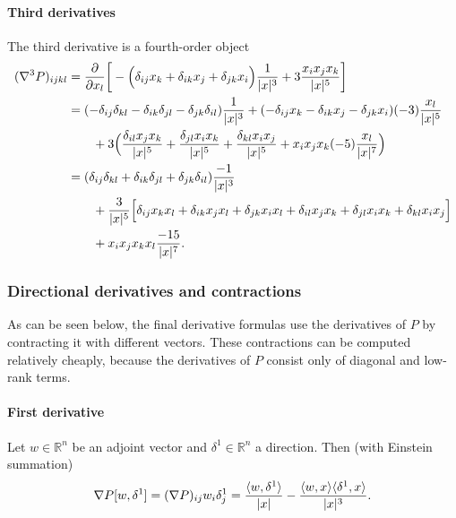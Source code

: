 \documentclass[a4paper]{article}
\newcommand{\R}{\mathbb R}
\DeclarePairedDelimiter{\abs}{\lvert}{\rvert}
\begin{document}
\paragraph{Third derivatives}

The third derivative is a fourth-order object
\begin{align*}
 (\nabla^3 P)_{ijkl}
 & =
 \frac{\partial}{\partial x_l}
 \bigg[ - \Big( \delta_{ij}x_k + \delta_{ik}x_j + \delta_{jk}x_i\Big) \frac{1}{\abs{x}^3}
 + 3 \frac{x_i x_j x_k}{\abs{x}^5} \bigg]
 \\
 & =
 (-\delta_{ij}\delta_{kl} - \delta_{ik}\delta_{jl} - \delta_{jk} \delta_{il}) \frac{1}{\abs{x}^3}
 + (-\delta_{ij}x_k - \delta_{ik}x_j - \delta_{jk}x_i)(-3)\frac{x_l}{\abs{x}^5}
 \\
 & \qquad
 + 3\Big(\frac{\delta_{il} x_j x_k}{\abs{x}^5} + \frac{\delta_{jl} x_i x_k}{\abs{x}^5}
   + \frac{\delta_{kl} x_i x_j}{\abs{x}^5} + x_i x_j x_k (-5) \frac{x_l}{\abs{x}^7} \Big)
 \\
 & =
 (\delta_{ij}\delta_{kl} + \delta_{ik}\delta_{jl} + \delta_{jk} \delta_{il}) \frac{-1}{\abs{x}^3}
 \\
 & \qquad
 + \frac{3}{\abs{x}^5} \Big[ \delta_{ij}x_k x_l + \delta_{ik}x_jx_l + \delta_{jk}x_ix_l
   + \delta_{il} x_j x_k + \delta_{jl} x_i x_k + \delta_{kl}x_i x_j \Big]
 \\
 & \qquad
 + x_i x_j x_k x_l \frac{-15}{\abs{x}^7}.
\end{align*}

\subsubsection{Directional derivatives and contractions}

As can be seen below, the final derivative formulas use the derivatives of $P$
by contracting it with different vectors.  These contractions can be computed
relatively cheaply, because the derivatives of $P$ consist only of diagonal
and low-rank terms.

\paragraph{First derivative}

Let $w \in \R^n$ be an adjoint vector and $\delta^1 \in \R^n$ a direction.  Then
(with Einstein summation)
\begin{equation*}
 \nabla P[w,\delta^1]
 =
 (\nabla P)_{ij} w_i \delta^1_j
 =
 \frac{\langle w,\delta^1\rangle}{\abs{x}} - \frac{\langle w,x\rangle \langle \delta^1,x\rangle}{\abs{x}^3}.
\end{equation*}
\end{document}
